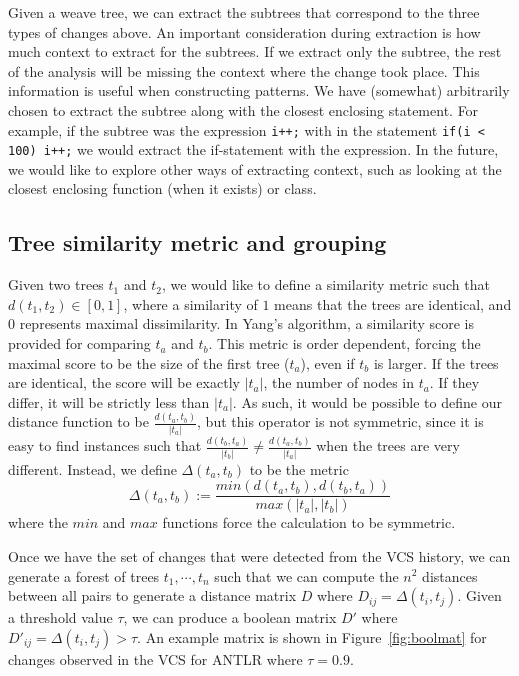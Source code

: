 Given a weave tree, we can extract the subtrees that correspond to the three
types of changes above.  An important consideration during extraction is how
much context to extract for the subtrees. If we extract only the subtree, the
rest of the analysis will be missing the context where the change took place.
This information is useful when constructing patterns. We have (somewhat)
arbitrarily chosen to extract the subtree along with the closest enclosing
statement. For example, if the subtree was the expression {\tt i++;} with in
the statement {\tt if(i < 100) i++;} we would extract the if-statement with the
expression. In the future, we would like to explore other ways of extracting
context, such as looking at the closest enclosing function (when it exists) or
class.

\subsection{Tree similarity metric and grouping}

Given two trees $t_1$ and $t_2$, we would like to define a similarity metric
such that $d(t_1, t_2) \in [0,1]$, where a similarity of $1$ means that the
trees are identical, and $0$ represents maximal dissimilarity.  In Yang's
algorithm, a similarity score is provided for comparing $t_a$ and $t_b$. This
metric is order dependent, forcing the maximal score to be the size of the
first tree ($t_a$), even if $t_b$ is larger.  If the trees are identical, the
score will be exactly $|t_a|$, the number of nodes in $t_a$.  If they differ,
it will be strictly less than $|t_a|$.  As such, it would be possible to define
our distance function to be $\frac{d(t_a, t_b)}{|t_a|}$, but this operator is
not symmetric, since it is easy to find instances such that $\frac{d(t_b,
t_a)}{|t_b|} \neq \frac{d(t_a, t_b)}{|t_a|}$ when the trees are very different.
Instead, we define $\Delta(t_a, t_b)$ to be the metric
$$\Delta(t_a, t_b) := \frac{min(d(t_a, t_b),d(t_b, t_a))}{max(|t_a|,|t_b|)}$$
where the $min$ and $max$ functions force the calculation to be symmetric.

Once we have the set of changes that were detected from the VCS history,
we can generate a forest of trees $t_1, \cdots, t_n$ such that we can
compute the $n^2$ distances between all pairs to generate a distance matrix
$D$ where $D_{ij} = \Delta(t_i, t_j)$.  Given a threshold value $\tau$, we can
produce a boolean matrix $D'$ where $D'_{ij} = \Delta(t_i, t_j) > \tau$.  An
example matrix is shown in Figure~\ref{fig:boolmat} for changes observed
in the VCS for ANTLR where $\tau = 0.9$.  

